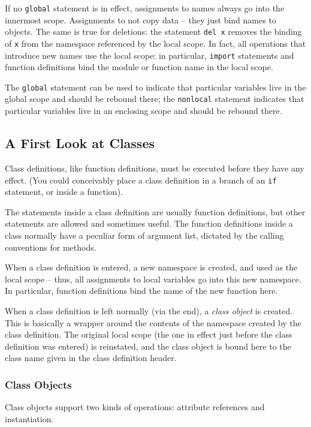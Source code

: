 If no \verb=global= statement is in effect,
assignments to names always go into the innermost scope.
Assignments to not copy data – they just bind names to objects.
The same is true for deletions:
the statement \verb=del x= removes the binding of \verb=x=
from the namespace referenced by the local scope.
In fact, all operations that introduce new names use the local scope:
in particular, \verb=import= statements and function definitions
bind the module or function name in the local scope.

The \verb=global= statement can be used to indicate
that particular variables live in the global scope and should be rebound there;
the \verb=nonlocal= statement indicates that particular variables
live in an enclosing scope and should be rebound there.


\subsection{A First Look at Classes}

Class definitions, like function definitions,
must be executed before they have any effect.
(You could conceivably place a class definition
in a branch of an \verb=if= statement, or inside a function).

The statements inside a class definition are usually function definitions,
but other statements are allowed and sometimes useful.
The function definitions inside a class
normally have a peculiar form of argument list,
dictated by the calling conventions for methods.

When a class definition is entered, a new namespace is created,
and used as the local scope – thus, all assignments to local variables
go into this new namespace.
In particular, function definitions bind the name of the new function here.

When a class definition is left normally (via the end),
a \emph{class object} is created.
This is basically a wrapper
around the contents of the namespace created by the class definition.
The original local scope
(the one in effect just before the class definition was entered) is reinstated,
and the class object is bound here
to the class name given in the class definition header.


\subsubsection{Class Objects}

Class objects support two kinds of operations:
attribute references and instantiation.

